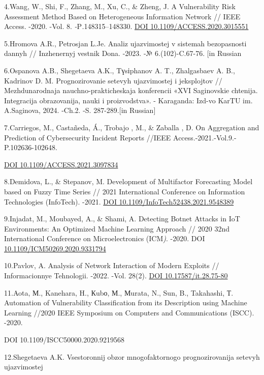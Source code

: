 \documentclass[
]{article}
\begin{document}
4.Wang, W., Shi, F., Zhang, M., Xu, C., \& Zheng, J. A Vulnerability
Risk Assessment Method Based on Heterogeneous Information Network //
IEEE Access. -2020. -Vol. 8. \emph{-}P\emph{.}148315--148330.
\href{https://doi.org/10.1109/ACCESS.2020.3015551}{DOI
10.1109/ACCESS.2020.3015551}

5.Hromova A.R., Petrosjan L.Je. Analiz ujazvimostej v sistemah
bezopasnosti dannyh // Inzhenernyj vestnik Dona. -2023. -№
6.(102)-C.67-76. {[}in Russian

6.Ospanova A.B., Shegetaeva A.K., Tүsіphanov A. T., Zhalgasbaev A. B.,
Kadrinov D. M. Prognozirovanie setevyh ujazvimostej i jeksplojtov //
Mezhdunarodnaja nauchno-prakticheskaja konferencii «XVI Saginovskie
chtenija. Integracija obrazovanija, nauki i proizvodstva». - Karaganda:
Izd-vo KarTU im. A.Saginova, 2024. -Ch.2. -S. 287-289.{[}in Russian{]}

7.Carriegos, M., Castañeda, Á., Trobajo , M., \& Zaballa , D. On
Aggregation and Prediction of Cybersecurity Incident Reports //IEEE
Access.-2021.-Vol.9.-P.102636-102648.

\href{https://doi.org/10.1109/ACCESS.2021.3097834}{DOI
10.1109/ACCESS.2021.3097834}

8.Demidova, L., \& Stepanov, M. Development of Multifactor Forecasting
Model based on Fuzzy Time Series // 2021 International Conference on
Information Technologies (InfoTech). -2021.
\href{https://doi.org/10.1109/InfoTech52438.2021.9548389}{DOI
10.1109/InfoTech52438.2021.9548389}

9.Injadat, M., Moubayed, A., \& Shami, A. Detecting Botnet Attacks in
IoT Environments: An Optimized Machine Learning Approach // 2020 32nd
International Conference on Microelectronics (ICM\emph{)}. -2020. DOI
\href{https://doi.org/10.1109/ICM50269.2020.9331794}{10.1109/ICM50269.2020.9331794}

10.Pavlov, A. Analysis of Network Interaction of Modern Exploits //
Informacionnye Tehnologii. -2022. -Vol. 28(2).
\href{https://doi.org/10.17587/it.28.75-80}{DOI 10.17587/it.28.75-80}

11.Aota, М., Kanehara, H., Кubо, М., Мurata, N., Sun, B., Takahashi, Т.
Automation of Vulnerability Classification from its Description using
Machine Learning //2020 IEEE Symposium on Computers and Communications
(ISCC). -2020.

DOI 10.1109/ISCC50000.2020.9219568

12.Shegetaeva A.K. Vsestoronnij obzor mnogofaktornogo prognozirovanija
setevyh ujazvimostej
\end{document}
